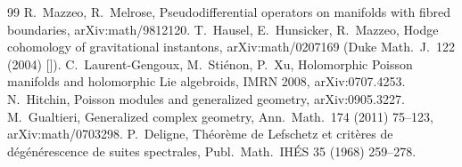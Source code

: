 \begin{thebibliography}{99}
 R.\ Mazzeo, R.\ Melrose, Pseudodifferential operators on manifolds with fibred boundaries, arXiv:math/9812120.
 T.\ Hausel, E.\ Hunsicker, R.\ Mazzeo, Hodge cohomology of gravitational instantons, arXiv:math/0207169 (Duke Math.\ J.\ 122 (2004) [\tQ]).
 C.\ Laurent-Gengoux, M.\ Sti\'enon, P.\ Xu, Holomorphic Poisson manifolds and holomorphic Lie algebroids, IMRN 2008, arXiv:0707.4253.
 N.\ Hitchin, Poisson modules and generalized geometry, arXiv:0905.3227.
 M.\ Gualtieri, Generalized complex geometry, Ann.\ Math.\ 174 (2011) 75--123, arXiv:math/0703298.
 P.\ Deligne, Th\'eor\`eme de Lefschetz et crit\`eres de d\'eg\'en\'erescence de suites spectrales, Publ.\ Math.\ IH\'ES 35 (1968) 259--278.
\end{thebibliography}
